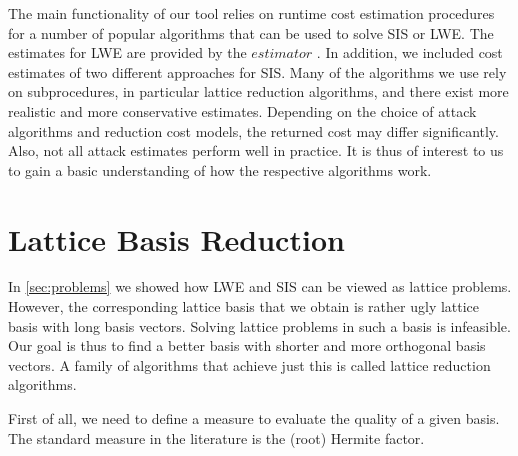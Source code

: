 The main functionality of our tool relies on runtime cost estimation procedures for a number of popular algorithms that can be used to solve SIS or LWE. The estimates for LWE are provided by the $\textit{estimator}$ \cite{APS15}. In addition, we included cost estimates of two different approaches for SIS. Many of the algorithms we use rely on subprocedures, in particular lattice reduction algorithms, and there exist more realistic and more conservative estimates. Depending on the choice of attack algorithms and reduction cost models, the returned cost may differ significantly. Also, not all attack estimates perform well in practice. It is thus of interest to us to gain a basic understanding of how the respective algorithms work.


\section{Lattice Basis Reduction} %
In \cref{sec:problems} we showed how LWE and SIS can be viewed as lattice problems. %
However, the corresponding lattice basis that we obtain is rather ugly lattice basis with long basis vectors. Solving lattice problems in such a basis is infeasible. Our goal is thus to find a better basis with shorter and more orthogonal basis vectors. A family of algorithms that achieve just this is called lattice reduction algorithms.

First of all, we need to define a measure to evaluate the quality of a given basis. The standard measure in the literature is the (root) Hermite factor.




